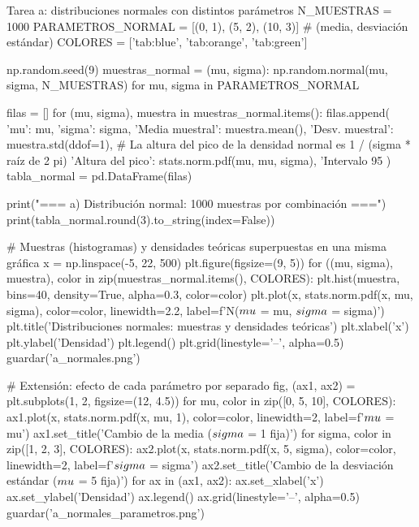 \documentclass[11pt,letterpaper]{article}
\begin{document}
\begin{codigo}[label=cod:a]{Tarea a: distribuciones normales con distintos parámetros}
N_MUESTRAS = 1000
PARAMETROS_NORMAL = [(0, 1), (5, 2), (10, 3)]  # (media, desviación estándar)
COLORES = ['tab:blue', 'tab:orange', 'tab:green']

np.random.seed(9)
muestras_normal = {(mu, sigma): np.random.normal(mu, sigma, N_MUESTRAS)
                   for mu, sigma in PARAMETROS_NORMAL}

filas = []
for (mu, sigma), muestra in muestras_normal.items():
    filas.append({
        'mu': mu, 'sigma': sigma,
        'Media muestral': muestra.mean(),
        'Desv. muestral': muestra.std(ddof=1),
        # La altura del pico de la densidad normal es 1 / (sigma * raíz de 2 pi)
        'Altura del pico': stats.norm.pdf(mu, mu, sigma),
        'Intervalo 95%
    })
tabla_normal = pd.DataFrame(filas)

print("=== a) Distribución normal: 1000 muestras por combinación ===")
print(tabla_normal.round(3).to_string(index=False))

# Muestras (histogramas) y densidades teóricas superpuestas en una misma gráfica
x = np.linspace(-5, 22, 500)
plt.figure(figsize=(9, 5))
for ((mu, sigma), muestra), color in zip(muestras_normal.items(), COLORES):
    plt.hist(muestra, bins=40, density=True, alpha=0.3, color=color)
    plt.plot(x, stats.norm.pdf(x, mu, sigma), color=color, linewidth=2.2,
             label=f'N($\\mu$ = {mu}, $\\sigma$ = {sigma})')
plt.title('Distribuciones normales: muestras y densidades teóricas')
plt.xlabel('x')
plt.ylabel('Densidad')
plt.legend()
plt.grid(linestyle='--', alpha=0.5)
guardar('a_normales.png')

# Extensión: efecto de cada parámetro por separado
fig, (ax1, ax2) = plt.subplots(1, 2, figsize=(12, 4.5))
for mu, color in zip([0, 5, 10], COLORES):
    ax1.plot(x, stats.norm.pdf(x, mu, 1), color=color, linewidth=2, label=f'$\\mu$ = {mu}')
ax1.set_title('Cambio de la media ($\\sigma$ = 1 fija)')
for sigma, color in zip([1, 2, 3], COLORES):
    ax2.plot(x, stats.norm.pdf(x, 5, sigma), color=color, linewidth=2, label=f'$\\sigma$ = {sigma}')
ax2.set_title('Cambio de la desviación estándar ($\\mu$ = 5 fija)')
for ax in (ax1, ax2):
    ax.set_xlabel('x')
    ax.set_ylabel('Densidad')
    ax.legend()
    ax.grid(linestyle='--', alpha=0.5)
guardar('a_normales_parametros.png')
\end{codigo}
\end{document}
